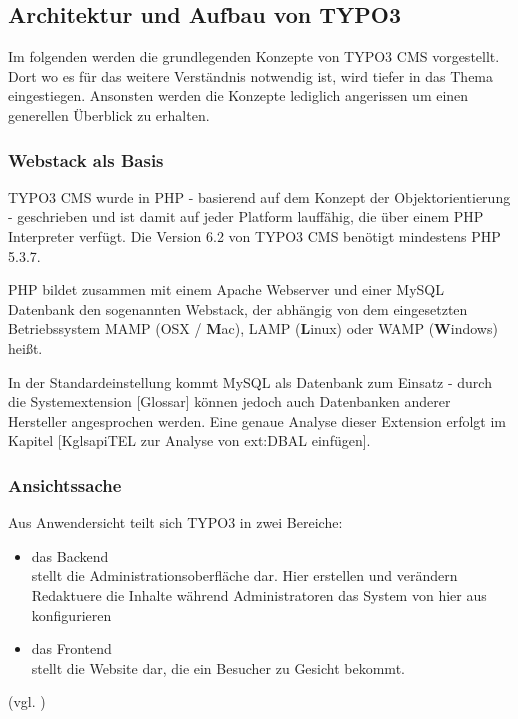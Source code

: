 \subsection{Architektur und Aufbau von TYPO3}
Im folgenden werden die grundlegenden Konzepte von TYPO3 CMS vorgestellt. Dort wo es für das weitere Verständnis notwendig ist, wird tiefer in das Thema eingestiegen. Ansonsten werden die Konzepte lediglich angerissen um einen generellen Überblick zu erhalten.

\subsubsection{Webstack als Basis}

TYPO3 CMS wurde in PHP - basierend auf dem Konzept der Objektorientierung - geschrieben und ist damit auf jeder Platform lauffähig, die über einem PHP Interpreter verfügt. Die Version 6.2 von TYPO3 CMS benötigt mindestens PHP 5.3.7.

PHP bildet zusammen mit einem Apache Webserver und einer MySQL Datenbank den sogenannten Webstack, der abhängig von dem eingesetzten Betriebssystem MAMP (OSX / {\bfseries M}ac), LAMP ({\bfseries L}inux) oder WAMP ({\bfseries W}indows) heißt.

In der Standardeinstellung kommt MySQL als Datenbank zum Einsatz - durch die Systemextension [Glossar] können jedoch auch Datenbanken anderer Hersteller angesprochen werden. Eine genaue Analyse dieser Extension erfolgt im Kapitel [Kgls{api}TEL zur Analyse von ext:DBAL einfügen].

\subsubsection{Ansichtssache}
Aus Anwendersicht teilt sich TYPO3 in zwei Bereiche:

\begin{itemize}
    \item das Backend\\
          stellt die Administrationsoberfläche dar. Hier erstellen und verändern Redaktuere die Inhalte während Administratoren das System von hier aus konfigurieren
    \item das Frontend\\
          stellt die Website dar, die ein Besucher zu Gesicht bekommt.
\end{itemize}
(vgl. \cite[S. 5]{book:dulepovTypo32008})



